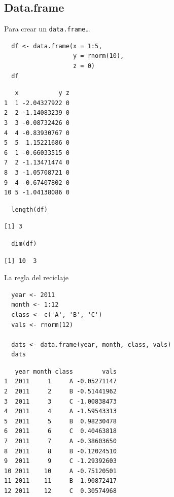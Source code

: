 \documentclass[xcolor={usenames,svgnames,dvipsnames}]{beamer}
\begin{document}
\subsection{Data.frame}
\label{sec-2-4}
\begin{frame}[fragile,label=sec-2-4-1]{Para crear un \texttt{data.frame}\ldots{}}
 \lstset{language=R,label= ,caption= ,numbers=none}
\begin{lstlisting}
  df <- data.frame(x = 1:5,
                   y = rnorm(10),
                   z = 0)
  df
\end{lstlisting}

\begin{verbatim}
   x           y z
1  1 -2.04327922 0
2  2 -1.14083239 0
3  3 -0.08732426 0
4  4 -0.83930767 0
5  5  1.15221686 0
6  1 -0.66033515 0
7  2 -1.13471474 0
8  3 -1.05708721 0
9  4 -0.67407802 0
10 5 -1.04138086 0
\end{verbatim}

\lstset{language=R,label= ,caption= ,numbers=none}
\begin{lstlisting}
  length(df)
\end{lstlisting}

\begin{verbatim}
[1] 3
\end{verbatim}

\lstset{language=R,label= ,caption= ,numbers=none}
\begin{lstlisting}
  dim(df)
\end{lstlisting}

\begin{verbatim}
[1] 10  3
\end{verbatim}
\end{frame}

\begin{frame}[fragile,label=sec-2-4-2]{La regla del reciclaje}
 \lstset{language=R,label= ,caption= ,numbers=none}
\begin{lstlisting}
  year <- 2011
  month <- 1:12
  class <- c('A', 'B', 'C')
  vals <- rnorm(12)
  
  dats <- data.frame(year, month, class, vals)
  dats
\end{lstlisting}

\begin{verbatim}
   year month class        vals
1  2011     1     A -0.05271147
2  2011     2     B -0.51441962
3  2011     3     C -1.00838473
4  2011     4     A -1.59543313
5  2011     5     B  0.98230478
6  2011     6     C  0.40463818
7  2011     7     A -0.38603650
8  2011     8     B -0.12024510
9  2011     9     C -1.29392603
10 2011    10     A -0.75120501
11 2011    11     B -1.90872417
12 2011    12     C  0.30574968
\end{verbatim}
\end{frame}
\end{document}
